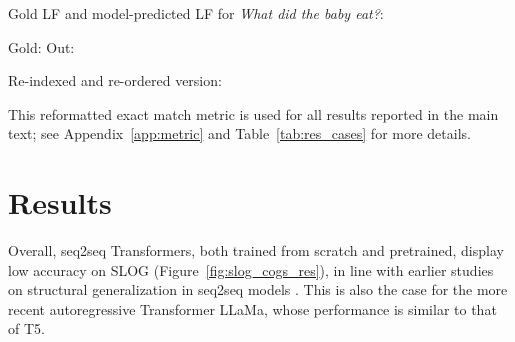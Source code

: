 \vspace{-0.5\baselineskip}
\begin{exe}
\ex \label{ex:eval_ori} Gold LF and model-predicted LF for \textit{What did the baby eat?}:
    \begin{xlist}
        \ex \label{ex:eval_ori_gold} Gold: 
    \ex \label{ex:eval_ori_pred} Out: 
    \end{xlist}
\ex \label{ex:eval_re} Re-indexed and re-ordered version: 
    \begin{xlist}
        \ex {}  	
    \end{xlist}
\end{exe}
\vspace{-0.5\baselineskip}
\noindent This reformatted exact match metric is used for all results reported in the main text; see Appendix~\ref{app:metric} and Table~\ref{tab:res_cases} for more details. 

\section{Results} \label{sec:slog_res}

Overall, seq2seq Transformers, both trained from scratch and pretrained, display low accuracy on SLOG (Figure~\ref{fig:slog_cogs_res}), in line with earlier studies on structural generalization in seq2seq models \citep{yao-koller-2022-structural}. This is also the case for the more recent autoregressive Transformer LLaMa, whose performance is similar to that of T5. 




